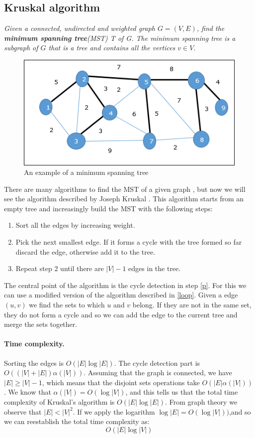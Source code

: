 \documentclass{article}
\begin{document}
\subsection{Kruskal algorithm}
\emph{Given a connected, undirected  and weighted  graph $G = (V,E)$,
find  the \textbf{minimum spanning tree}(MST) T  of G. The minimum spanning tree 
is a subgraph of $G$ that is a tree and contains all the vertices $v \in V$}.
    
\bigskip
\begin{figure}[h!]
    \centering
    \includegraphics[scale=0.8]{img/mst.png}
    \caption{An example of a minimum spanning tree}
\end{figure}
There are many algorithms to find the MST of a given graph \cite{prim1957shortest} \cite{nevsetvril2001otakar},
but now we will see the algorithm described by Joseph Kruskal \cite{kruskal1956shortest}.
This algorithm starts from an empty tree and increasingly build the MST with the following steps:
\begin{enumerate}
    \item Sort all the edges by increasing weight.
    \item \label{p}Pick the next smallest edge. If it forms a cycle with the  tree formed so far discard the edge, otherwise
    add it to the tree.
    \item Repeat step 2 until there are $|V| - 1$ edges in the tree.
\end{enumerate}
The central point of the algorithm is the cycle detection in step \ref{p}. For this we can use a modified version of the algorithm described in \ref{loop}.
Given a edge $(u,v)$ we find the sets to which $u$ and $v$ belong. If they are not in the same set, they do not form a cycle 
and so we can add the edge to the current tree and merge the sets together. 
\paragraph{Time complexity.} Sorting the edges is $O(|E|\log|E|)$. The cycle detection
part is $O((|V| + |E|)\alpha(|V|))$. Assuming that the graph is connected, we have
 $|E| \geq |V| - 1$, which means that the disjoint sets operations take $O(|E|\alpha(|V|))$. We know that
 $\alpha(|V|) = O(\log|V|)$, and this tells us that the total time complexity of Kruskal's algorithm
 is $O(|E|\log|E|)$. From graph theory we observe that $|E| < |V|^2$. If we apply the logarithm 
 $\log|E| = O(\log|V|))$,and so we can reestablish the total time complexity as:
 $$O(|E|\log|V|)$$
\end{document}
